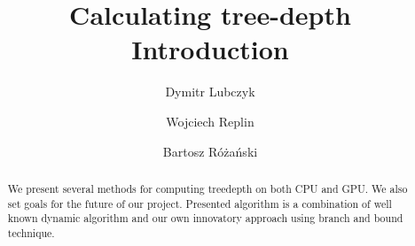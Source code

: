 \documentclass[a4paper]{article}
\title{Calculating tree-depth\\Introduction}
\author{Dymitr Lubczyk \and Wojciech Replin \and Bartosz Różański}
\theoremstyle{definition}
\begin{document}
\maketitle
\begin{abstract}
We present several methods for computing treedepth on both CPU and GPU. We also set goals for the future of our project. Presented algorithm is a combination of well known dynamic algorithm and our own innovatory approach using branch and bound technique.
\end{abstract}
\newpage
\tableofcontents
\newpage

\clearpage

\clearpage

\clearpage

\clearpage

\end{document}

